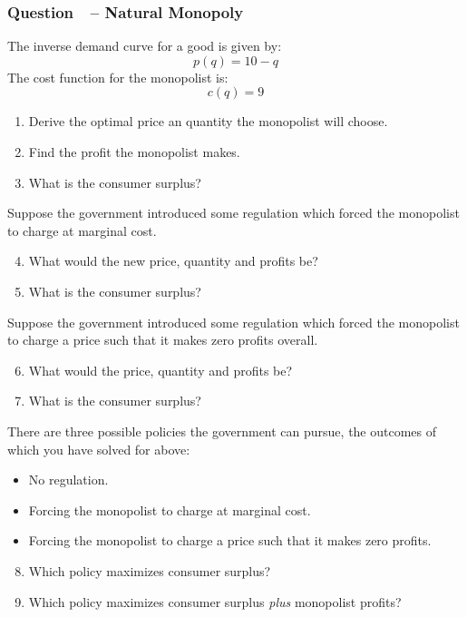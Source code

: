 \documentclass[12pt]{article}
\newcounter{question}[section]
\newcommand{\question}[1]{\refstepcounter{question}
  \subsubsection*{Question~\thequestion~-- #1}}
\newenvironment{subquestions}{
  \begin{enumerate}[label=(\roman*)]}{\end{enumerate}}
\begin{document}
\question{Natural Monopoly}
The inverse demand curve for a good is given by:
\[
  p\left( q \right)=10-q
\]
The cost function for the monopolist is:
\[
  c\left(  q\right)=9
\]
\begin{subquestions}
  \item Derive the optimal price an quantity the monopolist will choose.
  \item Find the profit the monopolist makes.
  \item What is the consumer surplus?
\end{subquestions}
Suppose the government introduced some regulation which forced the monopolist
to charge at marginal cost.
\begin{subquestions}
  \setcounter{enumi}{3}
  \item What would the new price, quantity and profits be?
  \item What is the consumer surplus?
\end{subquestions}
Suppose the government introduced some regulation which forced the monopolist
to charge a price such that it makes zero profits overall.
\begin{subquestions}
  \setcounter{enumi}{5}
  \item What would the price, quantity and profits be?
  \item What is the consumer surplus?
\end{subquestions}
There are three possible policies the government can pursue, the outcomes of
which you have solved for above:
    \begin{itemize}
      \item No regulation.
      \item Forcing the monopolist to charge at marginal cost.
      \item Forcing the monopolist to charge a price such that it makes zero
        profits.
    \end{itemize}
\begin{subquestions}
  \setcounter{enumi}{7}
  \item Which policy maximizes consumer surplus?
  \item Which policy maximizes consumer surplus \emph{plus} monopolist profits?
\end{subquestions}
\end{document}
